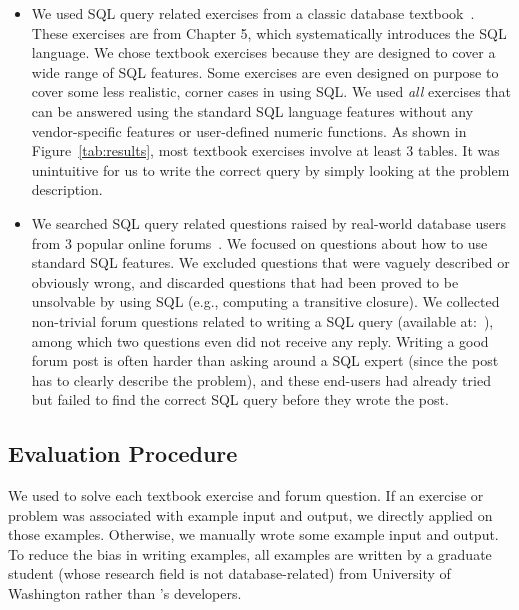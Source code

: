 \begin{itemize}
\item We used \allex SQL query related exercises
from a classic database textbook~\cite{cowbook}.
These exercises are from Chapter 5, which systematically
introduces the SQL language. We chose textbook exercises because they
are designed to
cover a wide range of SQL features. Some exercises
are even designed on purpose to cover some less realistic,
corner cases in using SQL. 
We used \textit{all} exercises that can be answered using the standard
SQL language features without any vendor-specific
features or user-defined numeric functions.
As shown in Figure~\ref{tab:results},
most textbook exercises involve at least 3 tables. It was unintuitive
for us to write the correct query by simply looking at the problem
description.

\item We searched SQL query related questions raised by real-world
database users from 3 popular online forums~\cite{stackoverflow,
tutorialized, dbjournal}.
We focused on questions about how to use standard SQL features.
We excluded questions that were vaguely described or obviously
wrong, and discarded questions that had been proved
to be unsolvable by using SQL (e.g., computing a
transitive closure).
We collected \pnum non-trivial forum questions related to writing a SQL query
(available at:~\cite{forumq}), among which
two questions even did not receive any reply.
Writing a good forum post is often harder than asking
around a SQL expert (since the post has to clearly 
describe the problem), and these end-users had already tried but
failed to find the correct SQL query before they wrote the post.
\end{itemize}



\subsection{Evaluation Procedure}

We used \ourtool to solve each textbook exercise and forum
question. If an exercise or problem
was associated with example input and output,
we directly applied \ourtool on those examples.
Otherwise, we manually wrote some example input and output.
To reduce the bias in writing
examples, all examples are written by a graduate
student (whose research field is not database-related) from University of Washington rather than
\ourtool's developers.

